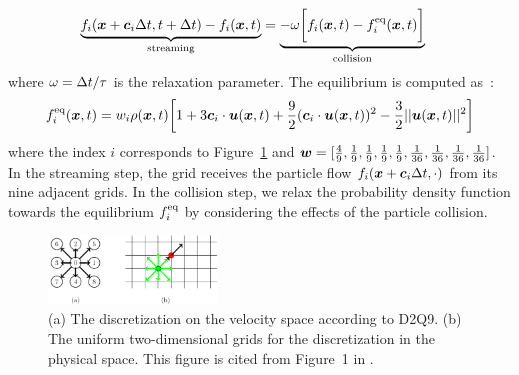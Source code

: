 \begin{equation}
\begin{aligned}
  \underbrace{f_i(\boldsymbol{x} + \boldsymbol{c}_i\Delta t , t + \Delta t) - f_i(\boldsymbol{x}, t)}_{
    \text{streaming}
  } &= 
  \underbrace{- \omega 
  \biggl[
    f_i(\boldsymbol{x}, t) -
    f^{\rm eq}_i(\boldsymbol{x}, t)
  \biggl]}_{
    \text{collision}
  }
\end{aligned}
\label{discretized-streaming}
\end{equation}
where $\omega = \Delta t / \tau$ is the relaxation parameter.
The equilibrium is computed as~\cite{zhao2002non}:
\begin{equation}
\begin{aligned}
  f^{\rm eq}_i(\boldsymbol{x}, t) &=
  w_i \rho(\boldsymbol{x}, t) \biggl[
    1 + 3 \boldsymbol{c}_i \cdot \boldsymbol{u}(\boldsymbol{x}, t) +
    \frac{9}{2}(\boldsymbol{c}_i \cdot \boldsymbol{u}(\boldsymbol{x}, t))^2
    -\frac{3}{2} || \boldsymbol{u}(\boldsymbol{x}, t) ||^2
  \biggr] \\
\end{aligned}
\label{discretized-eq}
\end{equation}
where the index $i$ corresponds to Figure~\ref{fig:d2q9}
and $\boldsymbol{w} = [\frac{4}{9}, \frac{1}{9}, \frac{1}{9}, \frac{1}{9}, \frac{1}{9}, \frac{1}{36}, \frac{1}{36}, \frac{1}{36}, \frac{1}{36}]$.
In the streaming step, the grid receives 
the particle flow $f_i(\boldsymbol{x} + \boldsymbol{c}_i \Delta t, \cdot)$
from its nine adjacent grids.
In the collision step,
we relax the probability density function 
towards the equilibrium $f_i^{\rm eq}$
by considering the effects of the particle collision.

\begin{figure}[h!]
  \begin{center}
   \includegraphics[width=0.4\textwidth]{logos/Gitter_LBM.png}
   \vspace{-3mm}
   \caption{
      (a) The discretization on the velocity space according to D2Q9.
      (b) The uniform two-dimensional grids for
      the discretization in the physical space.
      This figure is cited from Figure~1 in \cite{pastewka2019hpc}.
   }
  \label{fig:d2q9}
  \end{center}
  \vspace{-10mm}
\end{figure}


